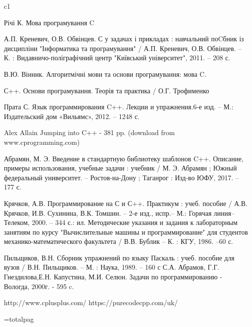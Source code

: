 \documentclass[a5paper,titlepage,openany,twoside,draft]{book_unv}%
\begin{document}
\begin{thebibliography} {c1}

 Річі К. Мова програмування C 

 А.П. Креневич, О.В. Обвінцев. С у задачах і прикладах : навчальний поCбник із дисципліни "Інформатика та програмування" / А.П. Креневич, О.В. Обвінцев. – К. : Видавничо-поліграфічний центр "Київський університет", 2011. – 208 с.

 В.Ю. Вінник. Алгоритмічні мови та основи програмування: мова C. 

С++. Основи програмування. Теорія та практика / О.Г. Трофименко 

Прата С. Язык программирования C++. Лекции и упражнения.6-е изд. – М.: Издательский дом «Вильямс», 2012. – 1248 с.

Alex Allain  Jumping into C++ - 381 pp. (download from www.cprogramming.com)

Абрамян, М. Э. Введение в стандартную библиотеку шаблонов C++. Описание, примеры использования, учебные задачи : учебник / М. Э. Абрамян ; Южный федеральный университет. – Ростов-на-Дону ; Таганрог : Изд-во ЮФУ, 2017. – 177 с.

Крячков, А.В. Программирование на С и С++. Практикум : учеб. пособие / А.В. Крячков, И.В. Сухинина, В.К. Томшин. – 2-е изд., испр.– М.: Горячая линия–Телеком, 2000. – 344 с.: ил.
Методические указания и задания к лабораторным занятиям по курсу "Вычислительные машины и программирование" для студентов механико-математического факультета / В.В. Бублик – К. : КГУ, 1986. –60 с.

Пильщиков, В.Н. Сборник упражнений по языку Паскаль : учеб. пособие для вузов / В.Н. Пильщиков. – М. : Наука, 1989. – 160 с
С.А. Абрамов, Г.Г. Гнездилова,Е.Н. Капустина, М.И. Селюн. Задачи по программированию - Вологда, 2000г. - 595 c.

http://www.cplusplus.com/
https://purecodecpp.com/uk/

\end{thebibliography}

=totalpag
\end{document}
